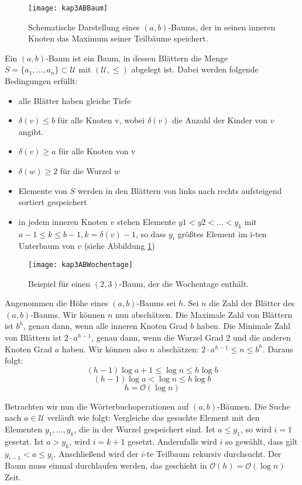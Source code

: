 \begin{Def}
  \begin{figure}[htb]
    \centering
    \texttt{[image: kap3ABBaum]}
  	\caption{Schematische Darstellung eines $(a,b)$-Baums, der in seinen inneren Knoten das Maximum seiner Teilbäume speichert.}
  	\label{kap3ABBaum}
  \end{figure}

\hspace{\parindent}Ein $(a, b)$-Baum ist ein Baum, in dessen Blättern die Menge $S = \{a_1, \ldots, a_n\} \subset \mathcal{U}$ mit $(\mathcal{U}, \le)$ abgelegt ist. Dabei werden folgende Bedingungen erfüllt:
\begin{itemize}
  \item alle Blätter haben gleiche Tiefe
  \item $\delta(v) \le b$ für alle Knoten v, wobei $\delta(v)$ die Anzahl der Kinder von $v$ angibt.
  \item $\delta(v) \ge a$ für alle Knoten von v
  \item $\delta(w) \ge 2$ für die Wurzel $w$
  \item Elemente von $S$ werden in den Blättern von links nach rechts aufsteigend sortiert gespeichert
  \item in jedem inneren Knoten $v$ stehen Elemente $y1 < y2 < \ldots < y_k$ mit $a-1 \le k \le b-1, k = \delta(v) -1$, so dass $y_i$ größtes Element im i-ten Unterbaum von $v$ (siehe Abbildung \ref{kap3ABBaum})
\end{itemize}
\end{Def}

\begin{figure}[htb]
  \centering
  \texttt{[image: kap3ABWochentage]}
  \caption{Beispiel für einen $(2, 3)$-Baum, der die Wochentage enthält.}
  \label{kap3ABWochentage}
\end{figure}

Angenommen die Höhe eines $(a, b)$-Baums sei $h$. Sei $n$ die Zahl der Blätter des $(a,b)$-Baums. Wir können $n$ nun abschätzen. Die Maximale Zahl von Blättern ist $b^h$, genau dann, wenn alle inneren Knoten Grad $b$ haben. Die Minimale Zahl von Blättern ist $2\cdot a^{h-1}$, genau dann, wenn die Wurzel Grad 2 und die anderen Knoten Grad $a$ haben. Wir können also $n$ abschätzen: $2 \cdot a^{h-1} \le n \le b^h$. Daraus folgt:
\[ (h-1) \log a + 1 \le \log n \le h \log b \]
\[ (h-1) \log a       < \log n \le h \log b \]
\[ h=\mathcal{O}(\log n) \]

Betrachten wir nun die Wörterbuchoperationen auf $(a, b)$-Bäumen. Die Suche nach $a \in \mathcal{U}$ verläuft wie folgt: Vergleiche das gesuchte Element mit den Elementen $y_1, \ldots, y_k$, die in der Wurzel gespeichert sind. Ist $a \le y_1$, so wird $i=1$ gesetzt. Ist $a > y_k$, wird $i=k+1$ gesetzt. Andernfalls wird $i$ so gewählt, dass gilt $y_{i-1} < a \le y_i$. Anschließend wird der $i$-te Teilbaum rekursiv durchsucht. Der Baum muss einmal durchlaufen werden, das geschieht in $\mathcal{O}(h) = \mathcal{O}(\log n)$ Zeit.

